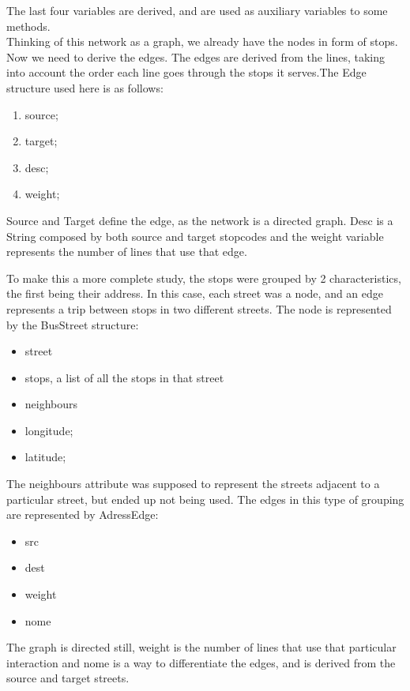 \documentclass[12pt]{article}
\begin{document}
\begin{multicols}{2}
The last four variables are derived, and are used as auxiliary variables to some methods.\\
Thinking of this network as a graph, we already have the nodes in form of stops. Now we need to derive the edges. The edges are derived from the lines, taking into account the order each line goes through the stops it serves.The Edge structure used here is as follows:
\begin{enumerate}
	\item source;
	\item target;
	\item desc;
	\item weight;
\end{enumerate}

Source and Target define the edge, as the network is a directed graph. Desc is a String composed by both source and target stopcodes and the weight variable represents the number of lines that use that edge. 

To make this a more complete study, the stops were grouped by 2 characteristics, the first being their address. In this case, each street was a node, and an edge represents a trip between stops in two different streets. The node is represented by the BusStreet structure:
\begin{itemize}
	\item street
	\item stops, a list of all the stops in that street
	\item neighbours
	\item longitude;
	\item latitude;
\end{itemize}

The neighbours attribute was supposed to represent the streets adjacent to a particular street, but ended up not being used. The edges in this type of grouping are represented by AdressEdge:
	
\begin{itemize}
	\item src
	\item dest
	\item weight
	\item nome
\end{itemize}
	
The graph is directed still, weight is the number of lines that use that particular interaction and nome is a way to differentiate the edges, and is derived from the source and target streets.\\


\end{multicols}
\end{document}
